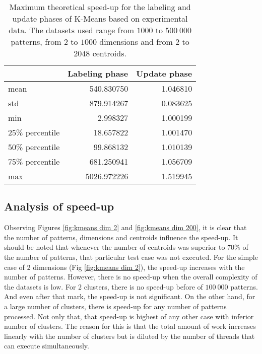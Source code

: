 \begin{table}[h]
\centering
\caption{Maximum theoretical speed-up for the labeling and update phases of K-Means based on experimental data. The datasets used range from $1000$ to $500 \: 000$ patterns, from $2$ to $1000$ dimensions and from $2$ to $2048$ centroids.}

\begin{tabular}{lrr}
\toprule
{} &  Labeling phase &  Update phase \\
\midrule
mean  &               540.830750 &                    1.046810 \\
std   &               879.914267 &                    0.083625 \\
min   &                 2.998327 &                    1.000199 \\
25\% percentile &      18.657822 &                    1.001470 \\
50\% percentile &      99.868132 &                    1.010139 \\
75\% percentile &     681.250941 &                    1.056709 \\
max   &              5026.972226 &                    1.519945 \\
\bottomrule
\end{tabular}

\label{tab:kmeans max speedup}
\end{table}


\subsection{Analysis of speed-up}

Observing Figures \ref{fig:kmeans dim 2} and \ref{fig:kmeans dim 200}, it is clear that the number of patterns, dimensions and centroids influence the speed-up.
It should be noted that whenever the number of centroids was superior to $70\%$ of the number of patterns, that particular test case was not executed.
For the simple case of 2 dimensions (Fig \ref{fig:kmeans dim 2}), the speed-up increases with the number of patterns.
However, there is no speed-up when the overall complexity of the datasets is low.
For 2 clusters, there is no speed-up before of $100 \: 000$ patterns.
And even after that mark, the speed-up is not significant.
On the other hand, for a large number of clusters, there is speed-up for any number of patterns processed.
Not only that, that speed-up is highest of any other case with inferior number of clusters.
The reason for this is that the total amount of work increases linearly with the number of clusters but is diluted by the number of threads that can execute simultaneously.

